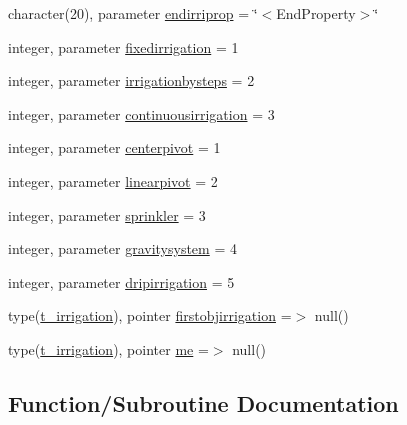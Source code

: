 \begin{DoxyCompactItemize}
\item 
character(20), parameter \mbox{\hyperlink{namespacemoduleirrigation_a65b1bc6c0161df8127aa3f2e0700aa0f}{endirriprop}} = \char`\"{}$<$End\+Property$>$\char`\"{}
\item 
integer, parameter \mbox{\hyperlink{namespacemoduleirrigation_af18536531d1a60d197cbd139c29b6a23}{fixedirrigation}} = 1
\item 
integer, parameter \mbox{\hyperlink{namespacemoduleirrigation_a6f420362ee468739eb03ec59c6122a8b}{irrigationbysteps}} = 2
\item 
integer, parameter \mbox{\hyperlink{namespacemoduleirrigation_a3f1f1153accbe98bce266d510f0f4040}{continuousirrigation}} = 3
\item 
integer, parameter \mbox{\hyperlink{namespacemoduleirrigation_add295bc7a511d04311da8b9a1a8c7d86}{centerpivot}} = 1
\item 
integer, parameter \mbox{\hyperlink{namespacemoduleirrigation_a932e0690fe4a0a49e49dc227e2125ce8}{linearpivot}} = 2
\item 
integer, parameter \mbox{\hyperlink{namespacemoduleirrigation_acd46c6a54f736c193beab3bdd802c697}{sprinkler}} = 3
\item 
integer, parameter \mbox{\hyperlink{namespacemoduleirrigation_acd6586cdd0a8288da599088d54558cc5}{gravitysystem}} = 4
\item 
integer, parameter \mbox{\hyperlink{namespacemoduleirrigation_af19cd97530363d4eae8f7dee720ca806}{dripirrigation}} = 5
\item 
type(\mbox{\hyperlink{structmoduleirrigation_1_1t__irrigation}{t\+\_\+irrigation}}), pointer \mbox{\hyperlink{namespacemoduleirrigation_a75d41f9a105660aa75946ab5de6c746c}{firstobjirrigation}} =$>$ null()
\item 
type(\mbox{\hyperlink{structmoduleirrigation_1_1t__irrigation}{t\+\_\+irrigation}}), pointer \mbox{\hyperlink{namespacemoduleirrigation_a82eeda1d7ba69cfca539fcb735102ccf}{me}} =$>$ null()
\end{DoxyCompactItemize}


\subsection{Function/\+Subroutine Documentation}
\mbox{\label{namespacemoduleirrigation_acc9d2d1967203bbf775af6570c0abd70}} 
